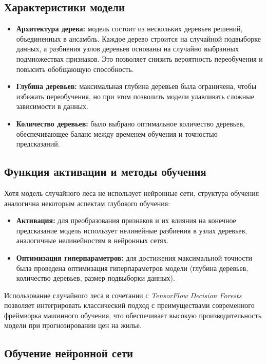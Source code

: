 {\subsection*{Характеристики модели}
\begin{itemize}
    \item \textbf{Архитектура дерева:} модель состоит из нескольких деревьев решений, объединенных в ансамбль. Каждое дерево строится на случайной подвыборке данных, а разбиения узлов деревьев основаны на случайно выбранных подмножествах признаков. Это позволяет снизить вероятность переобучения и повысить обобщающую способность.
    \item \textbf{Глубина деревьев:} максимальная глубина деревьев была ограничена, чтобы избежать переобучения, но при этом позволить модели улавливать сложные зависимости в данных.
    \item \textbf{Количество деревьев:} было выбрано оптимальное количество деревьев, обеспечивающее баланс между временем обучения и точностью предсказаний.
\end{itemize}

\subsection*{Функция активации и методы обучения}
Хотя модель случайного леса не использует нейронные сети, структура обучения аналогична некоторым аспектам глубокого обучения:
\begin{itemize}
    \item \textbf{Активация:} для преобразования признаков и их влияния на конечное предсказание модель использует нелинейные разбиения в узлах деревьев, аналогичные нелинейностям в нейронных сетях.
    \item \textbf{Оптимизация гиперпараметров:} для достижения максимальной точности была проведена оптимизация гиперпараметров модели (глубина деревьев, количество деревьев, размер подвыборки данных).
\end{itemize}

Использование случайного леса в сочетании с \textit{TensorFlow Decision Forests} позволяет интегрировать классический подход с преимуществами современного фреймворка машинного обучения, что обеспечивает высокую производительность модели при прогнозировании цен на жилье.


\subsection{Обучение нейронной сети}

}
